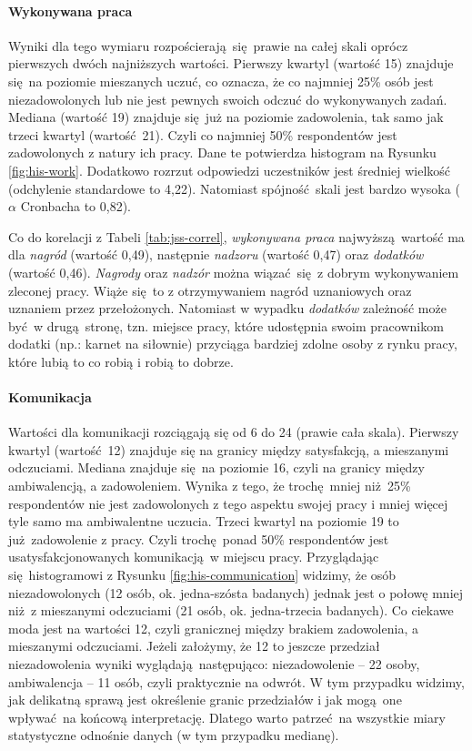 \paragraph{Wykonywana praca} Wyniki dla tego wymiaru rozpościerają się prawie na całej skali oprócz pierwszych dwóch najniższych wartości. Pierwszy kwartyl (wartość 15) znajduje się na poziomie mieszanych uczuć, co oznacza, że co najmniej 25\% osób jest niezadowolonych lub nie jest pewnych swoich odczuć do wykonywanych zadań. Mediana (wartość 19) znajduje się już na poziomie zadowolenia, tak samo jak trzeci kwartyl (wartość 21). Czyli co najmniej 50\% respondentów jest zadowolonych z
natury ich pracy. Dane te potwierdza histogram na Rysunku \ref{fig:his-work}. Dodatkowo rozrzut odpowiedzi uczestników jest średniej wielkość (odchylenie standardowe to 4,22). Natomiast spójność skali jest bardzo wysoka ($\alpha$ Cronbacha to 0,82).

Co do korelacji z Tabeli \ref{tab:jss-correl}, \textit{wykonywana praca} najwyższą wartość ma dla \textit{nagród} (wartość 0,49), następnie \textit{nadzoru} (wartość 0,47) oraz \textit{dodatków} (wartość 0,46). \textit{Nagrody} oraz \textit{nadzór} można wiązać się z dobrym wykonywaniem zleconej pracy. Wiąże się to z otrzymywaniem nagród uznaniowych oraz uznaniem przez przełożonych. Natomiast w wypadku \textit{dodatków} zależność może być w
drugą stronę, tzn. miejsce pracy, które udostępnia swoim
pracownikom dodatki (np.: karnet na siłownie) przyciąga bardziej zdolne osoby z rynku pracy, które lubią to co robią i robią to dobrze.

\paragraph{Komunikacja} Wartości dla komunikacji rozciągają się od 6 do 24 (prawie cała skala). Pierwszy kwartyl (wartość 12) znajduje się na granicy między satysfakcją, a mieszanymi odczuciami. Mediana znajduje się na poziomie 16, czyli na granicy między ambiwalencją, a zadowoleniem. Wynika z tego, że trochę mniej niż 25\% respondentów nie jest zadowolonych z tego aspektu swojej pracy i mniej więcej tyle samo ma ambiwalentne uczucia. Trzeci kwartyl na poziomie 19 to
już zadowolenie z pracy. Czyli trochę ponad 50\% respondentów jest usatysfakcjonowanych komunikacją w miejscu pracy. Przyglądając się histogramowi z Rysunku \ref{fig:his-communication} widzimy, że osób niezadowolonych (12 osób, ok. jedna-szósta badanych) jednak jest o połowę mniej niż z mieszanymi odczuciami (21 osób, ok. jedna-trzecia badanych). Co ciekawe moda jest na wartości 12, czyli granicznej między brakiem zadowolenia, a mieszanymi odczuciami. Jeżeli założymy, że 12 to jeszcze przedział
niezadowolenia wyniki wyglądają następująco: niezadowolenie -- 22 osoby, ambiwalencja -- 11 osób, czyli praktycznie na odwrót. W tym przypadku widzimy, jak delikatną sprawą jest określenie granic przedziałów i jak mogą one wpływać na końcową interpretację. Dlatego warto patrzeć na wszystkie miary statystyczne odnośnie danych (w tym przypadku medianę). 

